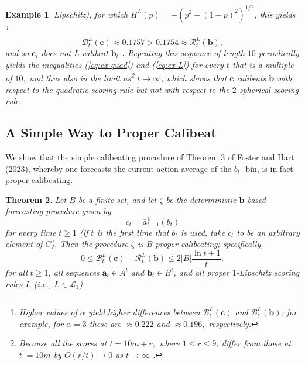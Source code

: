 \documentclass[12pt,a4paper,notitlepage]{article}
\newtheorem{theorem}{Theorem}
\newtheorem{example}[theorem]{Example}
\begin{document}
\begin{example}
Lipschitz), for which $H^{L}(p)=-(p^{2}+(1-p)^{2})^{1/2}$, this yields%
\footnote{%
Higher values of $\alpha $ yield higher differences between $\mathcal{B}%
_{t}^{L}(\mathbf{c})$ and $\mathcal{B}_{t}^{L}(\mathbf{b})$; for example,
for $\alpha =3$ these are $\approx 0.222$ and $\approx 0.196,$ respectively.}%
\begin{equation}
\mathcal{B}_{t}^{L}(\mathbf{c})\approx 0.1757>0.1754\approx \mathcal{R}%
_{t}^{L}(\mathbf{b}),  \label{eq:ex-L}
\end{equation}%
and so $\mathbf{c}_{t}$ does \emph{not} $L$-calibeat $\mathbf{b}_{t}$\textbf{%
.} Repeating this sequence of length $10$ periodically yields the
inequalities (\ref{eq:ex-quad}) and (\ref{eq:ex-L}) for every $t$ that is a
multiple of $10,$ and thus also in the limit as\footnote{%
Because all the scores at $t=10m+r,$ where $1\leq r\leq 9$, differ from
those at $t^{\prime }=10m$ by $O(r/t)\rightarrow 0$ as $t\rightarrow \infty $%
.} $t\rightarrow \infty $, which shows that $\mathbf{c}$ calibeats $\mathbf{b%
}$ with respect to the quadratic scoring rule but \emph{not} with respect to
the $2$-spherical scoring rule.
\end{example}

\subsection{A Simple Way to Proper Calibeat\label{s-s:simple}}

We show that the simple calibeating procedure of Theorem 3 of Foster and
Hart (2023), whereby one forecasts the current action average of the $b_{t}$%
-bin, is in fact proper-calibeating.

\begin{theorem}
\label{th:simple-calibeat-univ}Let $B$ be a finite set, and let $\zeta $ be
the deterministic $\mathbf{b}$-based forecasting procedure given by 
\begin{equation*}
c_{t}=\bar{a}_{t-1}^{\mathbf{b}}(b_{t})
\end{equation*}%
for every time $t\geq 1$ (if $t$ is the first time that $b_{t}$ is used,
take $c_{t}$ to be an arbitrary element of $C$). Then the procedure $\zeta $
is $B$-proper-calibeating; specifically,%
\begin{equation*}
0\leq \mathcal{B}_{t}^{L}(\mathbf{c})-\mathcal{R}_{t}^{L}(\mathbf{b})\leq
2|B|\frac{\ln t+1}{t},
\end{equation*}%
for all $t\geq 1$, all sequences $\mathbf{a}_{t}\in A^{t}$ and $\mathbf{b}%
_{t}\in B^{t}$, and all proper $1$-Lipschitz scoring rules $L$ (i.e., $L\in 
\mathcal{L}_{1}$).
\end{theorem}
\end{document}
